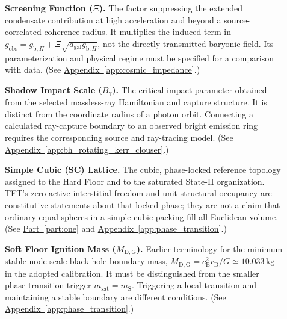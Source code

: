 \begin{description}
\item[] \begin{minipage}[t]{\linewidth}
\textbf{Screening Function ($\Xi$).} The factor suppressing the extended condensate contribution at high acceleration and beyond a source-correlated coherence radius. It multiplies the induced term in $g_{\mathrm{obs}}=g_{\mathrm b,\Pi}+\Xi\sqrt{a_{\mathrm{gal}}g_{\mathrm b,\Pi}}$, not the directly transmitted baryonic field. Its parameterization and physical regime must be specified for a comparison with data.
(See \hyperref[app:cosmic_impedance]{Appendix~\ref*{app:cosmic_impedance}}.)
\end{minipage}

\item[] \begin{minipage}[t]{\linewidth}
\textbf{Shadow Impact Scale ($B_\gamma$).} The critical impact parameter obtained from the selected massless-ray Hamiltonian and capture structure. It is distinct from the coordinate radius of a photon orbit. Connecting a calculated ray-capture boundary to an observed bright emission ring requires the corresponding source and ray-tracing model.
(See \hyperref[app:bh_rotating_kerr_clouser]{Appendix~\ref*{app:bh_rotating_kerr_clouser}}.)
\end{minipage}

\item[] \begin{minipage}[t]{\linewidth}
\textbf{Simple Cubic (SC) Lattice.} The cubic, phase-locked reference topology assigned to the Hard Floor and to the saturated State-II organization. TFT's zero active interstitial freedom and unit structural occupancy are constitutive statements about that locked phase; they are not a claim that ordinary equal spheres in a simple-cubic packing fill all Euclidean volume.
(See \hyperref[part:one]{Part~\ref*{part:one}} and \hyperref[app:phase_transition]{Appendix~\ref*{app:phase_transition}}.)
\end{minipage}

\item[] \begin{minipage}[t]{\linewidth}
\textbf{Soft Floor Ignition Mass ($M_{\mathrm{D,G}}$).} Earlier terminology for the minimum stable node-scale black-hole boundary mass, $M_{\mathrm{D,G}}=c_{\mathrm E}^2r_{\mathrm D}/G\simeq10.033\,\mathrm{kg}$ in the adopted calibration. It must be distinguished from the smaller phase-transition trigger $m_{\mathrm{sat}}=m_{\mathrm S}$. Triggering a local transition and maintaining a stable boundary are different conditions.
(See \hyperref[app:phase_transition]{Appendix~\ref*{app:phase_transition}}.)
\end{minipage}


\end{description}
